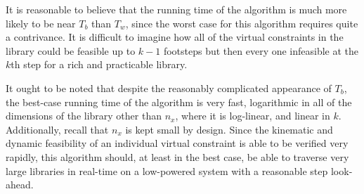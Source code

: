 It is reasonable to believe that the running time of the algorithm is much more likely to be near $T_b$ than $T_w$, since the worst case for this algorithm requires quite a contrivance. It is difficult to imagine how all of the virtual constraints in the library could be feasible up to $k-1$ footsteps but then every one infeasible at the $k$th step for a rich and practicable library.

It ought to be noted that despite the reasonably complicated appearance of $T_b$, the best-case running time of the algorithm is very fast, logarithmic in all of the dimensions of the library other than $n_x$, where it is log-linear, and linear in $k$. Additionally, recall that $n_x$ is kept small by design. Since the kinematic and dynamic feasibility of an individual virtual constraint is able to be verified very rapidly, this algorithm should, at least in the best case, be able to traverse very large libraries in real-time on a low-powered system with a reasonable step look-ahead.